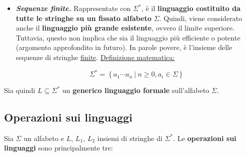\documentclass[a4paper]{article}
\begin{document}
\begin{itemize}
		\item[\ding{42}] \textcolor{Red3}{\textbf{\emph{Sequenze finite.}}} Rappresentate con $\Sigma^*$, è il \textbf{linguaggio costituito da tutte le stringhe su un fissato alfabeto} $\Sigma$. Quindi, viene considerato anche il \textbf{linguaggio più grande esistente}, ovvero il limite superiore. Tuttavia, questo non implica che sia il linguaggio più efficiente o potente (argomento approfondito in futuro). In parole povere, è l'insieme delle sequenze di stringhe \underline{finite}.\newline
		\underline{Definizione matematica:}

		\begin{equation*}
			\Sigma^* = \left\{a_1 \cdots a_n \: | \: n \ge 0, a_i \in \Sigma\right\}
		\end{equation*}
	\end{itemize}
	
	\noindent
	Sia quindi $L \subseteq \Sigma^*$ un \textbf{generico linguaggio formale} sull'alfabeto $\Sigma$.
	
	\newpage
	
	\subsection{Operazioni sui linguaggi}
	
	Sia $\Sigma$ un alfabeto e $L$, $L_1$, $L_2$ insiemi di stringhe di $\Sigma^*$. Le \textbf{operazioni sui linguaggi} sono principalmente tre:
	
\end{document}

